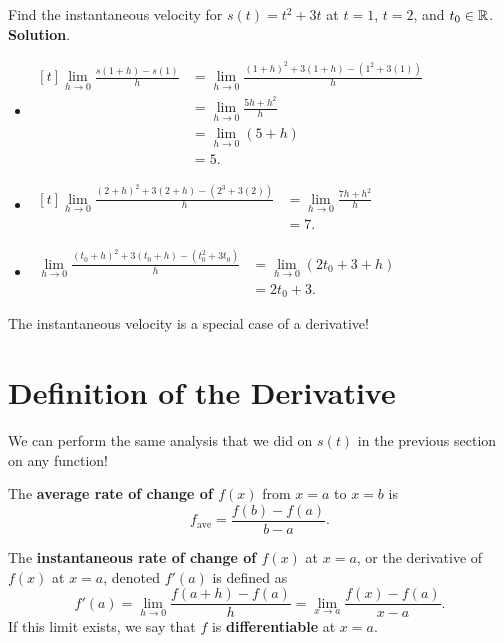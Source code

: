 \begin{Example}{}{}
    Find the instantaneous velocity for $ s(t)=t^2+3t $ at $ t=1 $, $ t=2 $, and $ t_0\in\mathbb{R} $.
    \tcblower{}
    \textbf{Solution}.
    \begin{itemize}
        \item $\begin{aligned}[t]
                      \lim\limits_{{h} \to {0}}\frac{s(1+h)-s(1)}{h}
                       & =\lim\limits_{{h} \to {0}}\frac{(1+h)^2+3(1+h)-(1^2+3(1))}{h} \\
                       & =\lim\limits_{{h} \to {0}}\frac{5h+h^2}{h}                    \\
                       & =\lim\limits_{{h} \to {0}}(5+h)                               \\
                       & =5.
                  \end{aligned}$
        \item $\begin{aligned}[t]
                      \lim\limits_{{h} \to {0}}\frac{(2+h)^2+3(2+h)-(2^3+3(2))}{h}
                       & =\lim\limits_{{h} \to {0}}\frac{7h+h^2}{h} \\
                       & =7.
                  \end{aligned}$
        \item $\begin{aligned}
                      \lim\limits_{{h} \to {0}}\frac{(t_0+h)^2+3(t_0+h)-(t_0^2+3t_0)}{h}
                       & =\lim\limits_{{h} \to {0}}(2 t_0+3+h) \\
                       & =2t_0+3.
                  \end{aligned}$
    \end{itemize}
    The instantaneous velocity is a special case of a derivative!
\end{Example}
\section{Definition of the Derivative}
We can perform the same analysis that we did on $ s(t) $ in the previous section on any function!
\begin{Definition}{}{}
    The \textbf{average rate of change of $ f(x) $} from $ x=a $ to $ x=b $ is
    \[ f_{\text{ave}}=\frac{f(b)-f(a)}{b-a}. \]
\end{Definition}
\begin{Definition}{}{}
    The \textbf{instantaneous rate of change of $ f(x) $} at $ x=a $, or the derivative of $ f(x) $ at $ x=a $, denoted $ f'(a) $
    is defined as
    \[ f'(a)=\lim\limits_{{h} \to {0}}\frac{f(a+h)-f(a)}{h}=\lim\limits_{{x} \to {a}}\frac{f(x)-f(a)}{x-a}. \]
    If this limit exists, we say that $ f $ is \textbf{differentiable} at $ x=a $.
\end{Definition}
